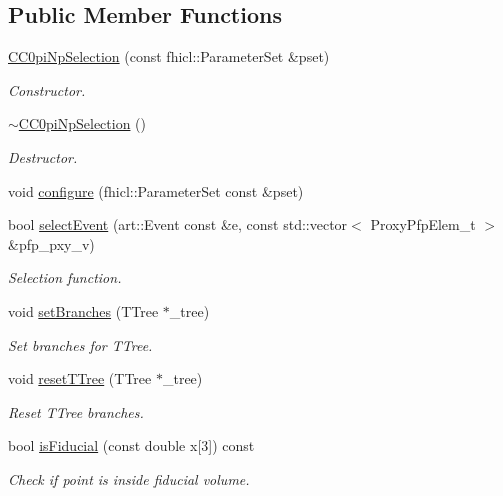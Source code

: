 \subsection*{Public Member Functions}
\begin{DoxyCompactItemize}
\item 
\hyperlink{classselection_1_1CC0piNpSelection_a5770519e6639db45cb9f3a4b1bf3efc2}{C\+C0pi\+Np\+Selection} (const fhicl\+::\+Parameter\+Set \&pset)
\begin{DoxyCompactList}\small\item\em Constructor. \end{DoxyCompactList}\item 
\hyperlink{classselection_1_1CC0piNpSelection_a7f809f358e84885ae2f08f54b4b8183b}{$\sim$\+C\+C0pi\+Np\+Selection} ()\hypertarget{classselection_1_1CC0piNpSelection_a7f809f358e84885ae2f08f54b4b8183b}{}\label{classselection_1_1CC0piNpSelection_a7f809f358e84885ae2f08f54b4b8183b}

\begin{DoxyCompactList}\small\item\em Destructor. \end{DoxyCompactList}\item 
void \hyperlink{classselection_1_1CC0piNpSelection_ace78372ffb6d92911f79ded647aacf4c}{configure} (fhicl\+::\+Parameter\+Set const \&pset)
\item 
bool \hyperlink{classselection_1_1CC0piNpSelection_aee88d296a2ebad59acadfd919139d96f}{select\+Event} (art\+::\+Event const \&e, const std\+::vector$<$ Proxy\+Pfp\+Elem\+\_\+t $>$ \&pfp\+\_\+pxy\+\_\+v)
\begin{DoxyCompactList}\small\item\em Selection function. \end{DoxyCompactList}\item 
void \hyperlink{classselection_1_1CC0piNpSelection_a6a14e4d0ff713ed2c75055019d278422}{set\+Branches} (T\+Tree $\ast$\+\_\+tree)
\begin{DoxyCompactList}\small\item\em Set branches for T\+Tree. \end{DoxyCompactList}\item 
void \hyperlink{classselection_1_1CC0piNpSelection_a3d7a6aa0fbd41f4a77390a160ee64e35}{reset\+T\+Tree} (T\+Tree $\ast$\+\_\+tree)
\begin{DoxyCompactList}\small\item\em Reset T\+Tree branches. \end{DoxyCompactList}\item 
bool \hyperlink{classselection_1_1CC0piNpSelection_ac3f55283ce26e2af8d5ba86a9faf0d23}{is\+Fiducial} (const double x\mbox{[}3\mbox{]}) const 
\begin{DoxyCompactList}\small\item\em Check if point is inside fiducial volume. \end{DoxyCompactList}\end{DoxyCompactItemize}
